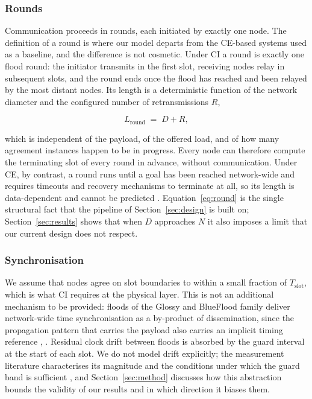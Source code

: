 \documentclass[journal]{IEEEtran}
\newcommand{\CI}{CI}                      %
\newcommand{\CE}{CE}                      %
\newcommand{\Nnodes}{N}                   %
\newcommand{\Diam}{D}                     %
\newcommand{\Nretx}{R}                    %
\newcommand{\Lround}{L_{\mathrm{round}}}  %
\newcommand{\Tslot}{T_{\mathrm{slot}}}    %
\begin{document}
\subsubsection{Rounds}
Communication proceeds in rounds, each initiated by exactly one node. The
definition of a round is where our model departs from the \CE-based
systems used as a baseline, and the difference is not cosmetic. Under
\CI{} a round is exactly one flood round: the initiator transmits in the
first slot, receiving nodes relay in subsequent slots, and the round ends
once the flood has reached and been relayed by the most distant nodes. Its
length is a deterministic function of the network diameter and the
configured number of retransmissions $\Nretx$,

\begin{equation}
\label{eq:round}
\Lround \;=\; \Diam + \Nretx ,
\end{equation}

which is independent of the payload, of the offered load, and of how many
agreement instances happen to be in progress. Every node can therefore
compute the terminating slot of every round in advance, without
communication. Under \CE, by contrast, a round runs until a goal has been
reached network-wide and requires timeouts and recovery mechanisms to
terminate at all, so its length is data-dependent and cannot be predicted
\cite{landsiedel13chaos}. Equation~\eqref{eq:round} is the single
structural fact that the pipeline of Section~\ref{sec:design} is built
on; Section~\ref{sec:results} shows that when $\Diam$ approaches
$\Nnodes$ it also imposes a limit that our current design does not
respect.

\subsubsection{Synchronisation}
We assume that nodes agree on slot boundaries to within a small fraction
of $\Tslot$, which is what \CI{} requires at the physical layer. This is
not an additional mechanism to be provided: floods of the Glossy and
BlueFlood family deliver network-wide time synchronisation as a
by-product of dissemination, since the propagation pattern that carries
the payload also carries an implicit timing reference
\cite{ferrari11glossy}, \cite{alnahas21blueflood}. Residual clock drift
between floods is absorbed by the guard interval at the start of each
slot. We do not model drift explicitly; the measurement literature
characterises its magnitude and the conditions under which the guard band
is sufficient \cite{baddeley23understanding}, and
Section~\ref{sec:method} discusses how this abstraction bounds the
validity of our results and in which direction it biases them.
\end{document}
